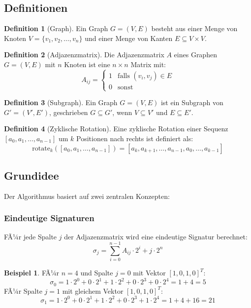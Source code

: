 ﻿\documentclass[a4paper,12pt]{article}
\theoremstyle{definition}
\newtheorem{definition}{Definition}
\newtheorem{beispiel}{Beispiel}
\begin{document}
\subsection{Definitionen}

\begin{definition}[Graph]
	Ein Graph $G = (V, E)$ besteht aus einer Menge von Knoten $V = \{v_1, v_2, \ldots, v_n\}$ und einer Menge von Kanten $E \subseteq V \times V$.
\end{definition}

\begin{definition}[Adjazenzmatrix]
	Die Adjazenzmatrix $A$ eines Graphen $G = (V, E)$ mit $n$ Knoten ist eine $n \times n$ Matrix mit:
	\[
	A_{ij} = \begin{cases}
		1 & \text{falls } (v_i, v_j) \in E \\
		0 & \text{sonst}
	\end{cases}
	\]
\end{definition}

\begin{definition}[Subgraph]
	Ein Graph $G = (V, E)$ ist ein Subgraph von $G' = (V', E')$, geschrieben $G \subseteq G'$, wenn $V \subseteq V'$ und $E \subseteq E'$.
\end{definition}

\begin{definition}[Zyklische Rotation]
	Eine zyklische Rotation einer Sequenz $[a_0, a_1, \ldots, a_{n-1}]$ um $k$ Positionen nach rechts ist definiert als:
	\[
	\text{rotate}_k([a_0, a_1, \ldots, a_{n-1}]) = [a_k, a_{k+1}, \ldots, a_{n-1}, a_0, \ldots, a_{k-1}]
	\]
\end{definition}

\subsection{Grundidee}

Der Algorithmus basiert auf zwei zentralen Konzepten:

\subsubsection{Eindeutige Signaturen}

FÃ¼r jede Spalte $j$ der Adjazenzmatrix wird eine eindeutige Signatur berechnet:
\[
\sigma_j = \sum_{i=0}^{n-1} A_{ij} \cdot 2^i + j \cdot 2^n
\]

\begin{beispiel}
	FÃ¼r $n=4$ und Spalte $j=0$ mit Vektor $[1, 0, 1, 0]^T$:
	\[
	\sigma_0 = 1 \cdot 2^0 + 0 \cdot 2^1 + 1 \cdot 2^2 + 0 \cdot 2^3 + 0 \cdot 2^4 = 1 + 4 = 5
	\]
	FÃ¼r Spalte $j=1$ mit gleichem Vektor $[1, 0, 1, 0]^T$:
	\[
	\sigma_1 = 1 \cdot 2^0 + 0 \cdot 2^1 + 1 \cdot 2^2 + 0 \cdot 2^3 + 1 \cdot 2^4 = 1 + 4 + 16 = 21
	\]
\end{beispiel}
\end{document}
